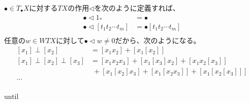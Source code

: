			$\bullet\in T_\bullet X$に対する$TX$の作用$\lhd$を次のように定義すれば、
			\begin{equation*}\begin{split} %
				\bullet\lhd1_* &= \bullet \\
				\bullet\lhd[t_1t_2\cdots t_m]&= \bullet[t_1t_2\cdots t_m] \\
			\end{split}\end{equation*} %
			任意の$w\in WTX$に対して$\bullet\lhd w\neq0$だから、次のようになる。
			\begin{equation*}\begin{split} %
				[x_1]\perp[x_2] &= [x_1x_2] + [x_1[x_2]] \\
				[x_1]\perp[x_2]\perp[x_3]
				&= [x_1x_2x_3]+[x_1[x_3]x_2]+[x_1x_2[x_3]] \\
				&\;+ [x_1[x_2]x_3]+[x_1[x_2x_3]]+[x_1[x_2[x_3]]] \\
				\dots \\
			\end{split}\end{equation*} %

until


